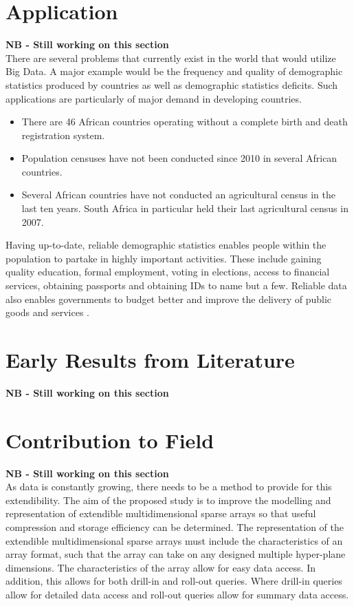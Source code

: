 \section{Application}
\textbf{NB - Still working on this section}\\
There are several problems that currently exist in the world that would utilize Big Data. A major example would be the frequency and quality of demographic statistics produced by countries as well as demographic statistics deficits. Such applications are particularly of major demand in developing countries.

\begin{itemize}
	\item There are 46 African countries operating without a complete birth and death registration system.
	\item Population censuses have not been conducted since 2010 in several African countries.
	\item Several African countries have not conducted an agricultural census in the last ten years. South Africa in particular held their last agricultural census in 2007.
\end{itemize}

Having up-to-date, reliable demographic statistics enables people within the population to partake in highly important activities. These include gaining quality education, formal employment, voting in elections, access to financial services, obtaining passports and obtaining IDs to name but a few. Reliable data also enables governments to budget better and improve the delivery of public goods and services \cite{mo:2015:sin}.


\section{Early Results from Literature}
\textbf{NB - Still working on this section}

\section{Contribution to Field}
\textbf{NB - Still working on this section}\\
As data is constantly growing, there needs to be a method to provide for this extendibility. The aim of the proposed study is to improve the modelling and representation of extendible multidimensional sparse arrays so that useful compression and storage efficiency can be determined. The representation of the extendible multidimensional sparse arrays must include the characteristics of an array format, such that the array can take on any designed multiple hyper-plane dimensions. The characteristics of the array allow for easy data access. In addition, this allows for both drill-in and roll-out queries. Where drill-in queries allow for detailed data access and roll-out queries allow for summary data access. %

